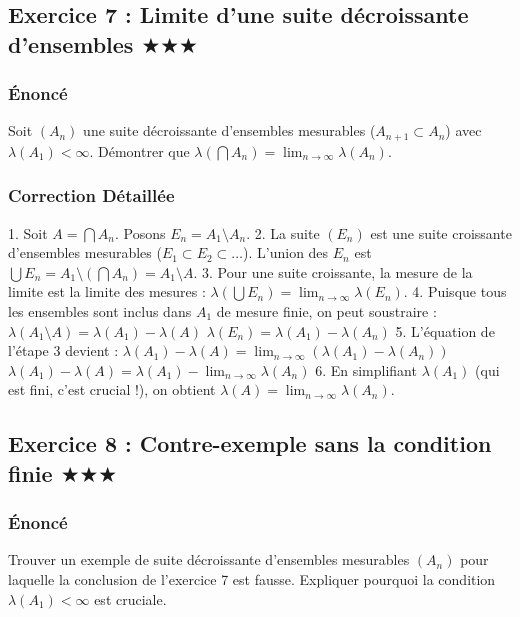\documentclass[11pt,a4paper]{article}
\begin{document}
\subsection*{Exercice 7 : Limite d'une suite décroissante d'ensembles \quad $\displaystyle \bigstar\bigstar\bigstar$}


\subsubsection*{Énoncé}

Soit $(A_n)$ une suite décroissante d'ensembles mesurables ($A_{n+1} \subset A_n$) avec $\lambda(A_1) < \infty$. Démontrer que $\lambda(\bigcap A_n) = \lim_{n \to \infty} \lambda(A_n)$.

\subsubsection*{Correction Détaillée}

1. Soit $A = \bigcap A_n$. Posons $E_n = A_1 \setminus A_n$.
2. La suite $(E_n)$ est une suite croissante d'ensembles mesurables ($E_1 \subset E_2 \subset \dots$).
L'union des $E_n$ est $\bigcup E_n = A_1 \setminus (\bigcap A_n) = A_1 \setminus A$.
3. Pour une suite croissante, la mesure de la limite est la limite des mesures :
$\lambda(\bigcup E_n) = \lim_{n \to \infty} \lambda(E_n)$.
4. Puisque tous les ensembles sont inclus dans $A_1$ de mesure finie, on peut soustraire :
$\lambda(A_1 \setminus A) = \lambda(A_1) - \lambda(A)$
$\lambda(E_n) = \lambda(A_1) - \lambda(A_n)$
5. L'équation de l'étape 3 devient :
$\lambda(A_1) - \lambda(A) = \lim_{n \to \infty} (\lambda(A_1) - \lambda(A_n))$
$\lambda(A_1) - \lambda(A) = \lambda(A_1) - \lim_{n \to \infty} \lambda(A_n)$
6. En simplifiant $\lambda(A_1)$ (qui est fini, c'est crucial !), on obtient $\lambda(A) = \lim_{n \to \infty} \lambda(A_n)$.


\subsection*{Exercice 8 : Contre-exemple sans la condition finie \quad $\displaystyle \bigstar\bigstar\bigstar$}


\subsubsection*{Énoncé}

Trouver un exemple de suite décroissante d'ensembles mesurables $(A_n)$ pour laquelle la conclusion de l'exercice 7 est fausse. Expliquer pourquoi la condition $\lambda(A_1) < \infty$ est cruciale.
\end{document}
